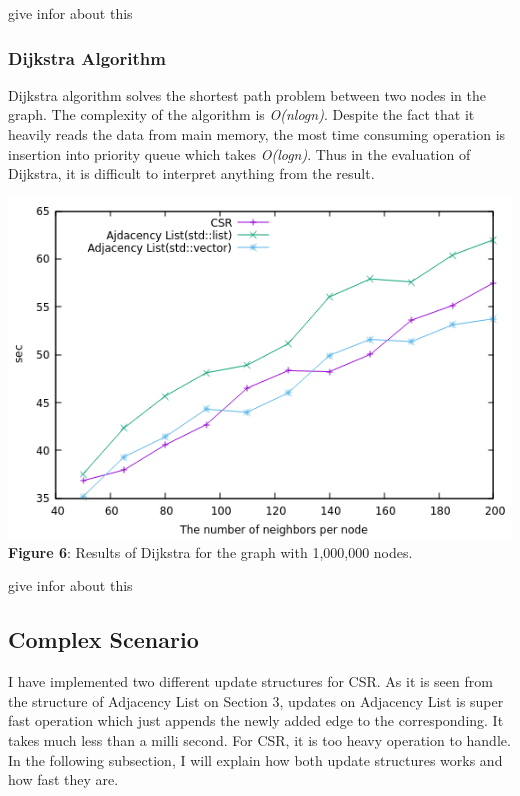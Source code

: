 \documentclass{article}
\begin{document}
give infor about this

\subsubsection*{Dijkstra Algorithm}
Dijkstra algorithm solves the shortest path problem between two nodes in the graph. The complexity of the algorithm is \textit{O(nlogn)}. Despite the fact that it heavily reads the data from main memory, the most time consuming operation is insertion into priority queue which takes \textit{O(logn)}. Thus in the evaluation of Dijkstra, it is difficult to interpret anything from the result.\\
\begin{center}
\includegraphics[scale = 0.6]{Dijkstra}\\
\textbf{Figure 6}: Results of Dijkstra for the graph with 1,000,000 nodes.
\end{center}


give infor about this

\subsection{Complex Scenario}
 I have implemented two different update structures for CSR. As it is seen from the structure of Adjacency List on Section 3, updates on Adjacency List is super fast operation which just appends the newly added edge to the corresponding. It takes much less than a milli second. For CSR, it is too heavy operation to handle. In the following subsection, I will explain how both update structures works and how fast they are.
 
\end{document}
